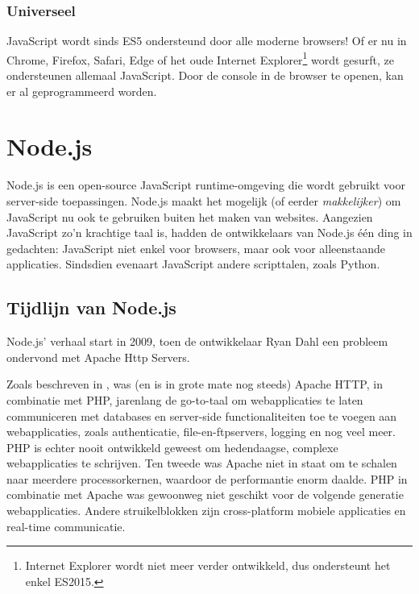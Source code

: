 \subsubsection{Universeel}
\label{sec:universal}

JavaScript wordt sinds ES5 ondersteund door alle moderne browsers! Of er nu in Chrome, Firefox, Safari, Edge of het oude Internet Explorer\footnote{Internet Explorer wordt niet meer verder ontwikkeld, dus ondersteunt het enkel ES2015.} wordt gesurft, ze ondersteunen allemaal JavaScript. Door de console in de browser te openen, kan er al geprogrammeerd worden.




\section{Node.js}
\label{sec:nodeJs}

Node.js is een open-source JavaScript runtime-omgeving die wordt gebruikt voor server-side toepassingen. Node.js maakt het mogelijk (of eerder \textit{makkelijker}) om JavaScript nu ook te gebruiken buiten het maken van websites. Aangezien JavaScript zo'n krachtige taal is, hadden de ontwikkelaars van Node.js één ding in gedachten: JavaScript niet enkel voor browsers, maar ook voor alleenstaande applicaties. Sindsdien evenaart JavaScript andere scripttalen, zoals Python. \textcite{Patel2018}

\subsection{Tijdlijn van Node.js}
\label{sec:nodeTimeline}
Node.js' verhaal start in 2009, toen de ontwikkelaar Ryan Dahl een probleem ondervond met Apache Http Servers. 

Zoals beschreven in \autocite{Chaniotis2015}, was (en is in grote mate nog steeds) Apache HTTP, in combinatie met PHP, jarenlang de go-to-taal om webapplicaties te laten communiceren met databases en server-side functionaliteiten toe te voegen aan \linebreak webapplicaties, zoals authenticatie, file-en-ftpservers, logging en nog veel meer. PHP is echter nooit ontwikkeld geweest om hedendaagse, complexe webapplicaties te schrijven. Ten tweede was Apache niet in staat om te schalen naar meerdere processorkernen, waardoor de performantie enorm daalde. PHP in combinatie met Apache was gewoonweg niet geschikt voor de volgende generatie webapplicaties. Andere struikelblokken zijn cross-platform mobiele applicaties en real-time communicatie.


